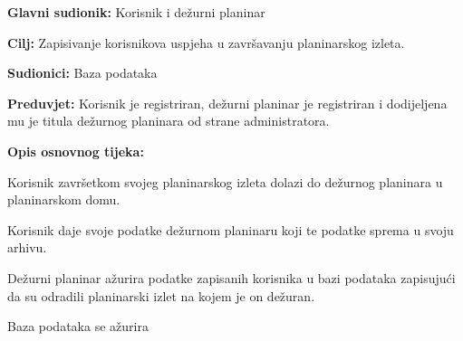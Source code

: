 		
		
		\noindent {}
		\begin{packed_item}
			
			\item \textbf{Glavni sudionik: } Korisnik i dežurni planinar
			\item  \textbf{Cilj:} Zapisivanje korisnikova uspjeha u završavanju planinarskog izleta.
			\item  \textbf{Sudionici:} Baza podataka
			\item  \textbf{Preduvjet:} Korisnik je registriran, dežurni planinar je registriran i dodijeljena mu je titula dežurnog planinara od strane administratora.
			\item  \textbf{Opis osnovnog tijeka:}
			
			\item[] \begin{packed_enum}
				
				\item Korisnik završetkom svojeg planinarskog izleta dolazi do dežurnog planinara u planinarskom domu.
				\item Korisnik daje svoje podatke dežurnom planinaru koji te podatke sprema u svoju arhivu.
				\item Dežurni planinar ažurira podatke zapisanih korisnika u bazi podataka zapisujući da su odradili planinarski izlet na kojem je on dežuran.
				\item Baza podataka se ažurira
				
			\end{packed_enum}
		\end{packed_item}
		
		
		
